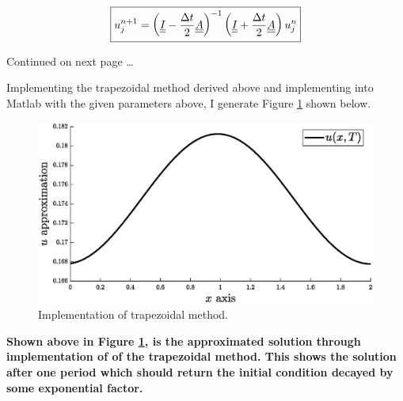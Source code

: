 \begin{enumerate}[label=\alph*., start = 1]
    \vspace{-0.5in}
    \begin{equation*}
        \boxed{u_j^{n+1}  = \left(\underline{\underline{I}} - \frac{\Delta t}{2}\underline{\underline{A}}\right)^{-1}\left(\underline{\underline{I}} + \frac{\Delta t}{2}\underline{\underline{A}}\right)u_j^n}
    \end{equation*}

    \vfill
    \begin{flushleft}
        Continued on next page \ldots
    \end{flushleft}

    \pagebreak
    Implementing the trapezoidal method derived above and implementing into Matlab with the given parameters above, I generate Figure \ref{fig:q3a} shown below.

    \begin{figure}[h]
        \centering
        \includegraphics[width = 0.9\linewidth]{q3/q3a.eps}
        \caption{Implementation of trapezoidal method.}
        \label{fig:q3a}
    \end{figure}

    \begin{fminipage}{0.9\linewidth}
        \textbf{Shown above in Figure \ref{fig:q3a}, is the approximated solution through implementation of of the trapezoidal method. This shows the solution after one period which should return the initial condition decayed by some exponential factor.}
    \end{fminipage}
\end{enumerate}

